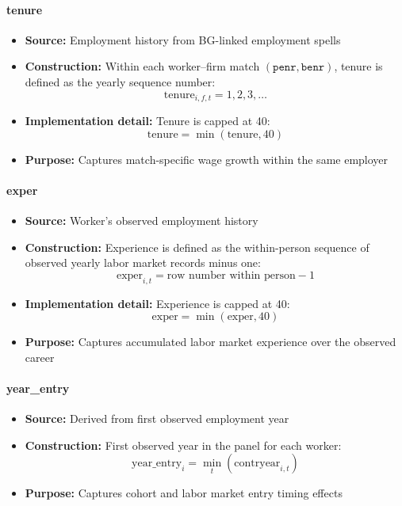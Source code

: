 \documentclass{article}
\begin{document}
\paragraph{tenure}
\begin{itemize}
    \item \textbf{Source:} Employment history from BG-linked employment spells
    \item \textbf{Construction:} Within each worker--firm match $(\texttt{penr}, \texttt{benr})$, tenure is defined as the yearly sequence number:
    \begin{equation}
        \text{tenure}_{i,f,t} = 1,2,3,\dots
    \end{equation}
    \item \textbf{Implementation detail:} Tenure is capped at 40:
    \begin{equation}
        \text{tenure} = \min(\text{tenure}, 40)
    \end{equation}
    \item \textbf{Purpose:} Captures match-specific wage growth within the same employer
\end{itemize}

\paragraph{exper}
\begin{itemize}
    \item \textbf{Source:} Worker's observed employment history
    \item \textbf{Construction:} Experience is defined as the within-person sequence of observed yearly labor market records minus one:
    \begin{equation}
        \text{exper}_{i,t} = \text{row number within person} - 1
    \end{equation}
    \item \textbf{Implementation detail:} Experience is capped at 40:
    \begin{equation}
        \text{exper} = \min(\text{exper}, 40)
    \end{equation}
    \item \textbf{Purpose:} Captures accumulated labor market experience over the observed career
\end{itemize}

\paragraph{year\_entry}
\begin{itemize}
    \item \textbf{Source:} Derived from first observed employment year
    \item \textbf{Construction:} First observed year in the panel for each worker:
    \begin{equation}
        \text{year\_entry}_i = \min_t(\text{contryear}_{i,t})
    \end{equation}
    \item \textbf{Purpose:} Captures cohort and labor market entry timing effects
\end{itemize}
\end{document}
